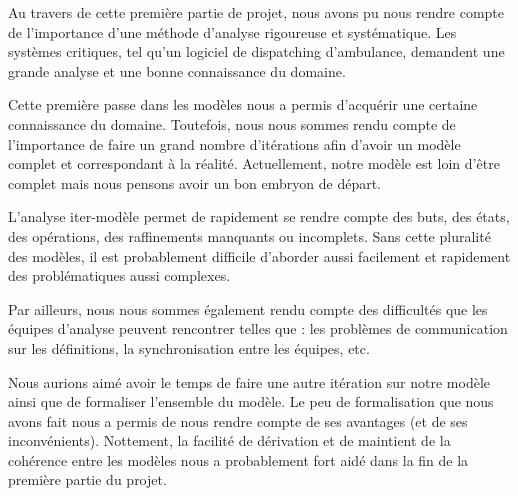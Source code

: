 Au travers de cette première partie de projet, nous avons pu nous rendre
compte de l'importance d'une méthode d'analyse rigoureuse et systématique.
Les systèmes critiques, tel qu'un logiciel de dispatching d'ambulance, demandent
une grande analyse et une bonne connaissance du domaine. 

Cette première passe dans les modèles nous a permis d'acquérir une certaine
connaissance du domaine. Toutefois, nous nous sommes rendu compte de 
l'importance de faire un grand nombre d'itérations afin d'avoir un modèle 
complet et correspondant à la réalité. Actuellement, notre modèle est loin
d'être complet mais nous pensons avoir un bon embryon de départ.

L'analyse iter-modèle permet de rapidement se rendre compte des buts, des
états, des opérations, des raffinements manquants ou incomplets. Sans cette 
pluralité des modèles, il est probablement difficile d'aborder aussi facilement
et rapidement des problématiques aussi complexes.

Par ailleurs, nous nous sommes également rendu compte des difficultés que les
équipes d'analyse peuvent rencontrer telles que : les problèmes de communication
sur les définitions, la synchronisation entre les équipes, etc.

Nous aurions aimé avoir le temps de faire une autre itération sur notre modèle
ainsi que de formaliser l'ensemble du modèle. Le peu de formalisation que nous
avons fait nous a permis de nous rendre compte de ses avantages (et de ses
inconvénients). Nottement, la facilité de dérivation et de maintient de la
cohérence entre les modèles nous a probablement fort aidé dans la fin de la
première partie du projet.
